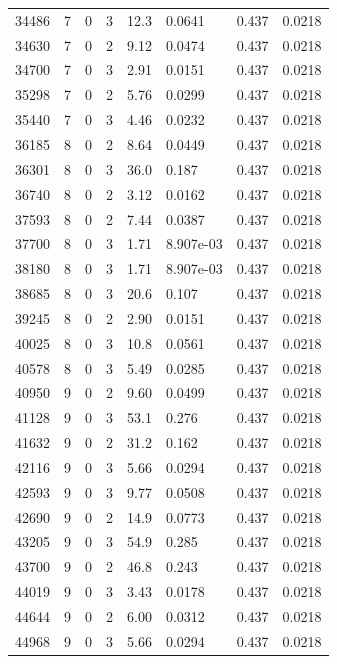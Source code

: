 \documentclass[preview]{standalone}
\begin{document}
{{{{{{{\begin{tabular}{L{1.2cm}C{1.2cm} C{0.3cm}C{0.5cm} C{1.4cm}C{1.4cm} C{1.4cm}C{1.4cm}}
  34486  &     7  & 0     &  3 &  12.3  & 0.0641  & 0.437 &  0.0218   \\ 
  34630  &     7  & 0     &  2 &  9.12  & 0.0474  & 0.437 &  0.0218   \\ 
  34700  &     7  & 0     &  3 &  2.91  & 0.0151  & 0.437 &  0.0218   \\ 
  35298  &     7  & 0     &  2 &  5.76  & 0.0299  & 0.437 &  0.0218   \\ 
  35440  &     7  & 0     &  3 &  4.46  & 0.0232  & 0.437 &  0.0218   \\ 
  36185  &     8  & 0     &  2 &  8.64  & 0.0449  & 0.437 &  0.0218   \\ 
  36301  &     8  & 0     &  3 &  36.0  & 0.187  & 0.437 &  0.0218   \\ 
  36740  &     8  & 0     &  2 &  3.12  & 0.0162  & 0.437 &  0.0218   \\ 
  37593  &     8  & 0     &  2 &  7.44  & 0.0387  & 0.437 &  0.0218   \\ 
  37700  &     8  & 0     &  3 &  1.71  & 8.907e-03  & 0.437 &  0.0218   \\ 
  38180  &     8  & 0     &  3 &  1.71  & 8.907e-03  & 0.437 &  0.0218   \\ 
  38685  &     8  & 0     &  3 &  20.6  & 0.107  & 0.437 &  0.0218   \\ 
  39245  &     8  & 0     &  2 &  2.90  & 0.0151  & 0.437 &  0.0218   \\ 
  40025  &     8  & 0     &  3 &  10.8  & 0.0561  & 0.437 &  0.0218   \\ 
  40578  &     8  & 0     &  3 &  5.49  & 0.0285  & 0.437 &  0.0218   \\ 
  40950  &     9  & 0     &  2 &  9.60  & 0.0499  & 0.437 &  0.0218   \\ 
  41128  &     9  & 0     &  3 &  53.1  & 0.276  & 0.437 &  0.0218   \\ 
  41632  &     9  & 0     &  2 &  31.2  & 0.162  & 0.437 &  0.0218   \\ 
  42116  &     9  & 0     &  3 &  5.66  & 0.0294  & 0.437 &  0.0218   \\ 
  42593  &     9  & 0     &  3 &  9.77  & 0.0508  & 0.437 &  0.0218   \\ 
  42690  &     9  & 0     &  2 &  14.9  & 0.0773  & 0.437 &  0.0218   \\ 
  43205  &     9  & 0     &  3 &  54.9  & 0.285  & 0.437 &  0.0218   \\ 
  43700  &     9  & 0     &  2 &  46.8  & 0.243  & 0.437 &  0.0218   \\ 
  44019  &     9  & 0     &  3 &  3.43  & 0.0178  & 0.437 &  0.0218   \\ 
  44644  &     9  & 0     &  2 &  6.00  & 0.0312  & 0.437 &  0.0218   \\ 
  44968  &     9  & 0     &  3 &  5.66  & 0.0294  & 0.437 &  0.0218   \\ 
\hline 
\end{tabular} 

}}}}}}}
\end{document}
